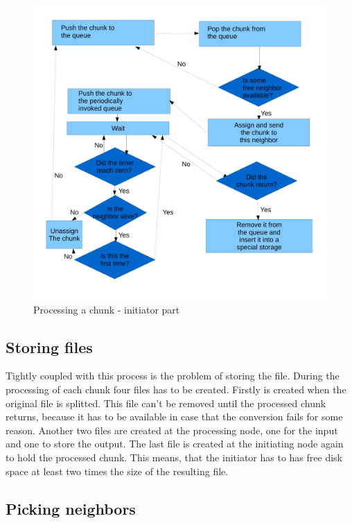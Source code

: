 \begin{figure}[h]
\begin{center}
\includegraphics[scale=0.40]{./img/workflow_chunks.pdf}
\caption{Processing a chunk - initiator part}
\end{center}
\end{figure}

\subsection*{Storing files}

Tightly coupled with this process is the problem of storing the file.
During the processing of each chunk four files has to be created.
Firstly is created when the original file is splitted. This file can't
be removed until the processed chunk returns, because it has to be
available in case that the conversion fails for some reason. Another two
files are created at the processing node, one for the input and one to
store the output. The last file is created at the initiating node again
to hold the processed chunk. This means, that the initiator has to has
free disk space at least two times the size of the resulting file.

\subsection*{Picking neighbors}

